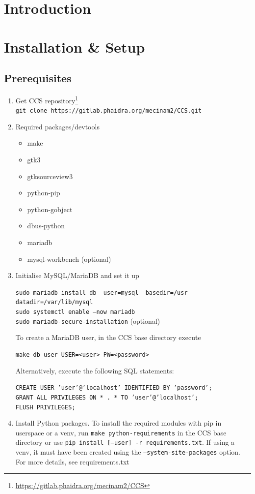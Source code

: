 \chapter{Introduction}


\chapter{Installation \& Setup}

\section{Prerequisites}
\begin{enumerate}
\item Get CCS repository\footnote{\href{https://gitlab.phaidra.org/mecinam2/CCS}{https://gitlab.phaidra.org/mecinam2/CCS}}\vspace{5pt}\\
\texttt{git clone https://gitlab.phaidra.org/mecinam2/CCS.git}
    
\item Required packages/devtools
\begin{itemize}
  \item make
  \item gtk3
  \item gtksourceview3
  \item python-pip
  \item python-gobject
  \item dbus-python
  \item mariadb
  \item mysql-workbench (optional)
\end{itemize}

\item Initialise MySQL/MariaDB and set it up

\texttt{sudo mariadb-install-db --user=mysql --basedir=/usr --datadir=/var/lib/mysql}\\
\texttt{sudo systemctl enable --now mariadb}\\
\texttt{sudo mariadb-secure-installation}  (optional)

    To create a MariaDB user, in the CCS base directory execute
    
	\texttt{make db-user USER=<user> PW=<password>}

    Alternatively, execute the following SQL statements:
    
	\texttt{CREATE USER 'user'@'localhost' IDENTIFIED BY 'password';}\\
	\texttt{GRANT ALL PRIVILEGES ON * . * TO 'user'@'localhost';}\\
	\texttt{FLUSH PRIVILEGES;}
    
\item {Install Python packages. To install the required modules with pip in userspace or a venv, run
   \texttt{make python-requirements} in the CCS base directory or use \texttt{pip install [--user] -r requirements.txt}.
   If using a venv, it must have been created using the \texttt{--system-site-packages} option.
   For more details, see requirements.txt}
\end{enumerate}

